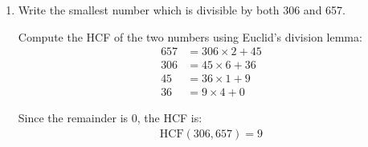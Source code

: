 \begin{enumerate}[label=\thesubsection.\arabic*, ref=\thesubsection.\theenumi]
	\solution
	Taking the first vertex as the origin, form two displacement edge vectors:
	\begin{align*}
		\mathbf{u} &= \vec{AB} = \begin{bmatrix} -4 - 1 \\ 6 - (-1) \end{bmatrix} = \begin{bmatrix} -5 \\ 7 \end{bmatrix} \\
		\mathbf{v} &= \vec{AC} = \begin{bmatrix} -3 - 1 \\ -5 - (-1) \end{bmatrix} = \begin{bmatrix} -4 \\ -4 \end{bmatrix}
	\end{align*}
	
	The area corresponds to half the absolute value of the 2x2 determinant formed by these column vectors:
	\begin{align*}
		\text{Area} &= \frac{1}{2} \left| \det \begin{bmatrix} \mathbf{u} & \mathbf{v} \end{bmatrix} \right| \\
		&= \frac{1}{2} \left| \det \begin{bmatrix} -5 & -4 \\ 7 & -4 \end{bmatrix} \right| \\
		&= \frac{1}{2} \left| 48 \right| = 24\text{ sq. units}
	\end{align*}
	

	\item  Write the smallest number which is divisible by both 306 and 657.
	
	\solution
	Compute the HCF of the two numbers using Euclid's division lemma:
	\begin{align*}
		657 &= 306 \times 2 + 45 \\
		306 &= 45 \times 6 + 36 \\
		45 &= 36 \times 1 + 9 \\
		36 &= 9 \times 4 + 0
	\end{align*}
	
	Since the remainder is 0, the HCF is:
	\begin{align*}
		\text{HCF}(306, 657) = 9
	\end{align*}
	

\end{enumerate}
